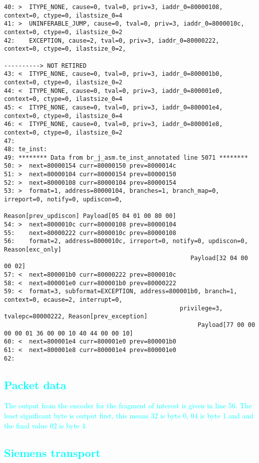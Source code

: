\begin {lstlisting}[basicstyle=\tiny]
40: >  ITYPE_NONE, cause=0, tval=0, priv=3, iaddr_0=80000108, context=0, ctype=0, ilastsize_0=4
41: >  UNINFERABLE_JUMP, cause=0, tval=0, priv=3, iaddr_0=8000010c, context=0, ctype=0, ilastsize_0=2
42:    EXCEPTION, cause=2, tval=0, priv=3, iaddr_0=80000222, context=0, ctype=0, ilastsize_0=2,
                                                                              ----------> NOT RETIRED
43: <  ITYPE_NONE, cause=0, tval=0, priv=3, iaddr_0=800001b0, context=0, ctype=0, ilastsize_0=2
44: <  ITYPE_NONE, cause=0, tval=0, priv=3, iaddr_0=800001e0, context=0, ctype=0, ilastsize_0=4
45: <  ITYPE_NONE, cause=0, tval=0, priv=3, iaddr_0=800001e4, context=0, ctype=0, ilastsize_0=4
46: <  ITYPE_NONE, cause=0, tval=0, priv=3, iaddr_0=800001e8, context=0, ctype=0, ilastsize_0=2
47:
48: te_inst:
49: ******** Data from br_j_asm.te_inst_annotated line 5071 ********
50: >  next=80000154 curr=80000150 prev=8000014c
51: >  next=80000104 curr=80000154 prev=80000150
52: >  next=80000108 curr=80000104 prev=80000154
53: >  format=1, address=80000104, branches=1, branch_map=0, irreport=0, notify=0, updiscon=0,
                                                  Reason[prev_updiscon] Payload[05 04 01 00 80 00]
54: >  next=8000010c curr=80000108 prev=80000104
55:    next=80000222 curr=8000010c prev=80000108
56:    format=2, address=8000010c, irreport=0, notify=0, updiscon=0, Reason[exc_only]
                                                    Payload[32 04 00 00 02]
57: <  next=800001b0 curr=80000222 prev=8000010c
58: <  next=800001e0 curr=800001b0 prev=80000222
59: <  format=3, subformat=EXCEPTION, address=800001b0, branch=1, context=0, ecause=2, interrupt=0,
                                                 privilege=3, tvalepc=80000222, Reason[prev_exception]
                                                      Payload[77 00 00 00 00 01 36 00 00 10 40 44 00 00 10]
60: <  next=800001e4 curr=800001e0 prev=800001b0
61: <  next=800001e8 curr=800001e4 prev=800001e0
62:
\end{lstlisting}

\textcolor{cyan}{\subsection{Packet data}}

\textcolor{cyan}{The output from the encoder for the fragment of interest is given in
line 56. The least significant byte is output first, this means 32 is
byte 0, 04 is byte 1 and and the final value 02 is byte 4.}

\textcolor{cyan}{\subsection{Siemens transport}}

